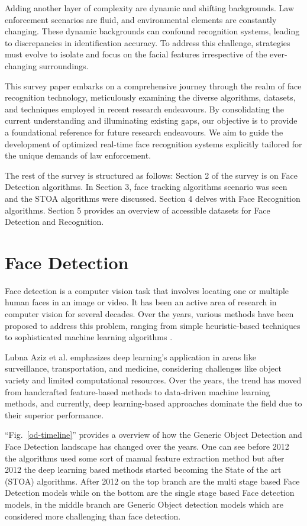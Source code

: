Adding another layer of complexity are dynamic and shifting backgrounds. Law enforcement scenarios are fluid, and environmental elements are constantly changing. These dynamic backgrounds can confound recognition systems, leading to discrepancies in identification accuracy. To address this challenge, strategies must evolve to isolate and focus on the facial features irrespective of the ever-changing surroundings.

This survey paper embarks on a comprehensive journey through the realm of face recognition technology, meticulously examining the diverse algorithms, datasets, and techniques employed in recent research endeavours. By consolidating the current understanding and illuminating existing gaps, our objective is to provide a foundational reference for future research endeavours. We aim to guide the development of optimized real-time face recognition systems explicitly tailored for the unique demands of law enforcement. 

The rest of the survey is structured as follows: Section 2 of the survey is on Face Detection algorithms. In Section 3, face tracking algorithms scenario was seen and the STOA algorithms were discussed. Section 4 delves with Face Recognition algorithms. Section 5 provides an overview of accessible datasets for Face Detection and Recognition.

\section{Face Detection} \label{section:fd}
Face detection is a computer vision task that involves locating one or multiple human faces in an image or video. It has been an active area of research in computer vision for several decades. Over the years, various methods have been proposed to address this problem, ranging from simple heuristic-based techniques to sophisticated machine learning algorithms \cite{feng_detect_2022}.

Lubna Aziz et al. \cite{aziz_exploring_2020} emphasizes deep learning's application in areas like surveillance, transportation, and medicine, considering challenges like object variety and limited computational resources. Over the years, the trend has moved from handcrafted feature-based methods to data-driven machine learning methods, and currently, deep learning-based approaches dominate the field due to their superior performance.

``Fig.~\ref{od-timeline}'' provides a overview of how the Generic Object Detection and Face Detection landscape has changed over the years. One can see before 2012 the algorithms used some sort of manual feature extraction method but after 2012 the deep learning based methods started becoming the State of the art (STOA) algorithms. After 2012 on the top branch are the multi stage based Face Detection models while on the bottom are the single stage based Face detection models, in the middle branch are Generic Object detection models which are considered more challenging than face detection.

